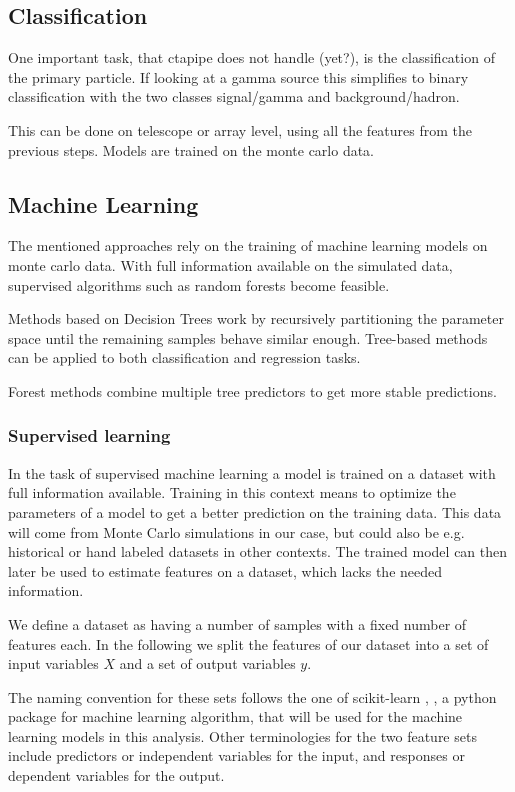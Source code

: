 \subsection{Classification}
One important task, that ctapipe does not handle (yet?), is the classification of
the primary particle. If looking at a gamma source this simplifies
to binary classification with the two classes signal/gamma and background/hadron.

This can be done on telescope or array level, using all the features from the previous
steps. Models are trained on the monte carlo data.

\subsection{Machine Learning}
The mentioned approaches rely on the training of machine learning models on
monte carlo data.
With full information available on the simulated data, supervised
algorithms such as random forests become feasible.

Methods based on Decision Trees work by recursively partitioning
the parameter space until the remaining samples behave similar enough.
Tree-based methods can be applied to both classification and regression tasks.

Forest methods combine multiple tree predictors to get more stable
predictions.

\subsubsection{Supervised learning}
In the task of supervised machine learning a model is trained on a
dataset with full information available.
Training in this context means to optimize the parameters of a 
model to get a better prediction on the training data.
This data will come from Monte Carlo simulations in our case, but
could also be e.g. historical or hand labeled datasets in other contexts.
The trained model can then later be used to estimate features on a dataset, which
lacks the needed information.

We define a dataset as having a number of samples with a fixed number of
features each. In the following we split
the features of our dataset into a set of input variables $X$ and
a set of output variables $y$.

The naming convention for
these sets follows the one of scikit-learn
\cite{scikit-learn}, \cite{sklearn_api}, a python package for
machine learning algorithm, that will be used for the
machine learning models in this analysis.
Other terminologies for the two feature sets include
predictors or independent variables for the input, and
responses or dependent variables for the output.

